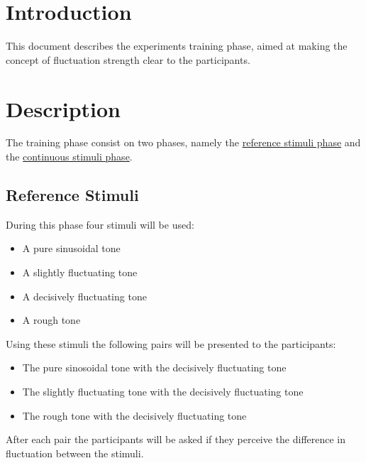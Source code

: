 \documentclass[a4paper]{article}
\begin{document}

\section{Introduction} %
\label{sec:introduction}

This document describes the experiment\textquotesingle s training phase, aimed
at making the concept of fluctuation strength clear to the participants.


\section{Description} %
\label{sec:description}

The training phase consist on two phases, namely the
\hyperref[sub:reference_stimuli]{reference stimuli phase} and the
\hyperref[sub:continuous_stimuli]{continuous stimuli phase}.

\subsection{Reference Stimuli} %
\label{sub:reference_stimuli}

During this phase four stimuli will be used:

\begin{itemize}
  \item A pure sinusoidal tone
  \item A slightly fluctuating tone
  \item A decisively fluctuating tone
  \item A rough tone
\end{itemize}

Using these stimuli the following pairs will be presented to the participants:

\begin{itemize}
  \item The pure sinosoidal tone with the decisively fluctuating tone
  \item The slightly fluctuating tone with the decisively fluctuating tone
  \item The rough tone with the decisively fluctuating tone
\end{itemize}

After each pair the participants will be asked if they perceive the difference
in fluctuation between the stimuli.
\end{document}
